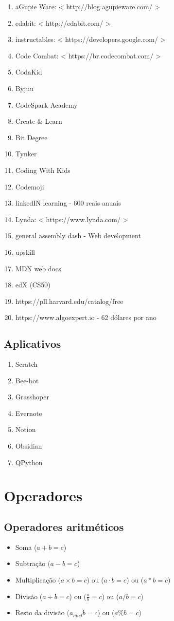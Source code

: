 \documentclass[12pt,a4paper]{article} %
\begin{document}
\begin{enumerate}
					\item aGupie Ware: < http://blog.agupieware.com/ >
					\item edabit: < http://edabit.com/ >
					\item instructables: < https://developers.google.com/ >
					\item Code Combat: < https://br.codecombat.com/ >
					\item CodaKid
					\item Byjuu
					\item CodeSpark Academy
					\item Create \& Learn
					\item Bit Degree
					\item Tynker
					\item Coding With Kids
					\item Codemoji
					\item linkedIN learning - 600 reais anuais
					\item Lynda: < https://www.lynda.com/ >
					\item general assembly dash - Web development
					\item upskill
					\item MDN web docs
					\item edX (CS50)
					\item https://pll.harvard.edu/catalog/free
					\item https://www.algoexpert.io - 62 dólares por ano
			\end{enumerate}
		\subsection{Aplicativos}
			\begin{enumerate}
					\item Scratch
					\item Bee-bot
					\item Grasshoper
					\item Evernote
					\item Notion
					\item Obsidian
					\item QPython
			\end{enumerate}
	\section{Operadores}
		\subsection{Operadores aritméticos}
			\begin{itemize}
				\item Soma ($a + b = c$)
				\item Subtração ($a - b = c$)
				\item Multiplicação ($a \times b = c$) ou ($a \cdot b = c$) ou ($a * b = c$)
				\item Divisão ($a \div b = c$) ou ($\frac{a}{b} = c$) ou ($a/b = c$)
				\item Resto da divisão ($a _{mod}b = c$) ou ($a \% b = c$)
			\end{itemize}
\end{document}

